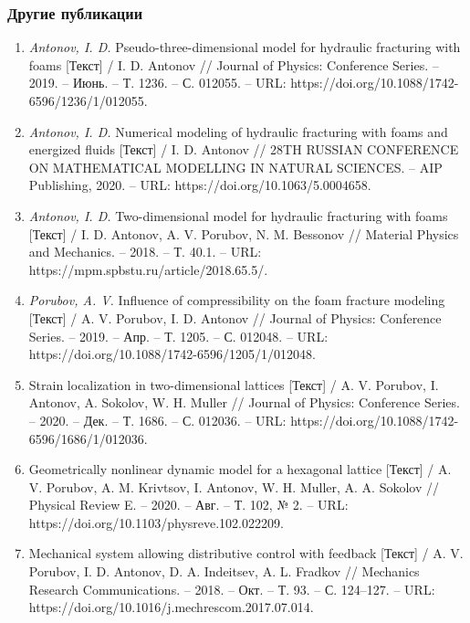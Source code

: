 \begin{frame}
\frametitle{Другие публикации}
\begin{tiny}
\begin{enumerate}
	\item \textit{Antonov, I. D.} Pseudo-three-dimensional model for hydraulic fracturing with foams [Текст] / I. D. Antonov // Journal of Physics: Conference Series. -- 2019. -- Июнь. -- Т. 1236. -- С. 012055. -- URL: https://doi.org/10.1088/1742-6596/1236/1/012055.
	
	\item \textit{Antonov, I. D.} Numerical modeling of hydraulic fracturing with foams and energized fluids [Текст] / I. D. Antonov // 28TH RUSSIAN CONFERENCE ON MATHEMATICAL MODELLING IN NATURAL SCIENCES. -- AIP Publishing, 2020. -- URL: https://doi.org/10.1063/5.0004658.
	
	\item \textit{Antonov, I. D.} Two-dimensional model for hydraulic fracturing with foams [Текст] / I. D. Antonov, A. V. Porubov, N. M. Bessonov // Material Physics and Mechanics. -- 2018. -- Т. 40.1. -- URL: https://mpm.spbstu.ru/article/2018.65.5/.
	
	\item \textit{Porubov, A. V.} Influence of compressibility on the foam fracture modeling [Текст] / A. V. Porubov, I. D. Antonov // Journal of Physics: Conference Series. -- 2019. -- Апр. -- Т. 1205. -- С. 012048. -- URL: https://doi.org/10.1088/1742-6596/1205/1/012048.
	
	\item Strain localization in two-dimensional lattices [Текст] / A. V. Porubov, I. Antonov, A. Sokolov, W. H. Muller // Journal of Physics: Conference Series. -- 2020. -- Дек. -- Т. 1686. -- С. 012036. -- URL: https://doi.org/10.1088/1742-6596/1686/1/012036.
	
	\item Geometrically nonlinear dynamic model for a hexagonal lattice [Текст] / A. V. Porubov, A. M. Krivtsov, I. Antonov, W. H. Muller, A. A. Sokolov // Physical Review E. -- 2020. -- Авг. -- Т. 102, № 2. -- URL: https://doi.org/10.1103/physreve.102.022209.
	
	\item Mechanical system allowing distributive control with feedback [Текст] / A. V. Porubov, I. D. Antonov, D. A. Indeitsev, A. L. Fradkov // Mechanics Research Communications. -- 2018. -- Окт. -- Т. 93. -- С. 124--127. -- URL: https://doi.org/10.1016/j.mechrescom.2017.07.014.
	

\end{enumerate}
\end{tiny}
\end{frame}

